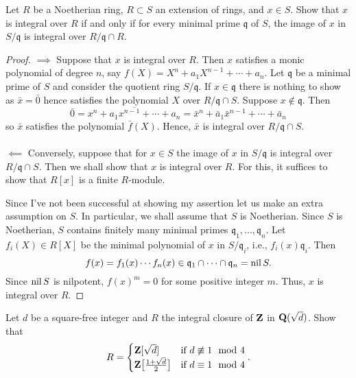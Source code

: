 \begin{problem}
Let $R$ be a Noetherian ring, $R\subset S$ an extension of rings,
and $x\in S$. Show that $x$ is integral over $R$ if and only if
for every minimal prime $\mathfrak{q}$ of $S$, the image of $x$
in $S/\mathfrak{q}$ is integral over $R/\mathfrak{q}\cap R$.
\end{problem}
\begin{proof}
$\implies$ Suppose that $x$ is integral over $R$. Then $x$ satisfies a
monic polynomial of degree $n$, say $f(X)=X^n+a_1X^{n-1}+\cdots+a_n$. Let
$\mathfrak{q}$ be a minimal prime of $S$ and consider the quotient ring
$S/\mathfrak{q}$. If $x\in\mathfrak{q}$ there is nothing to show as $\bar
x=\bar 0$ hence satisfies the polynomial $X$ over $R/\mathfrak{q}\cap
S$. Suppose $x\notin\mathfrak{q}$. Then
\[
\bar 0=\overline{x^n+a_1x^{n-1}+\cdots+a_n}
=\bar x^n+\bar a_1\bar x^{n-1}+\cdots+\bar a_n
\]
so $\bar x$ satisfies the polynomial $\bar f(X)$. Hence, $\bar x$ is
integral over $R/\mathfrak{q}\cap S$.
\\\\
$\impliedby$ Conversely, suppose that for $x\in S$ the image of $x$ in
$S/\mathfrak{q}$ is integral over $R/\mathfrak{q}\cap S$. Then we shall
show that $x$ is integral over $R$. For this, it suffices to show that
$R[x]$ is a finite $R$-module.

Since I've not been successful at showing my assertion let us make an extra
assumption on $S$. In particular, we shall assume that $S$ is
Noetherian. Since $S$ is Noetherian, $S$ contains finitely many minimal
primes $\mathfrak{q}_1,...,\mathfrak{q}_n$. Let $f_i(X)\in R[X]$ be the
minimal polynomial of $x$ in $S/\mathfrak{q}_i$, i.e.,
$f_i(x)\mathfrak{q}_i$. Then
\[
f(x)=f_1(x)\cdots f_n(x)\in\mathfrak{q}_1\cap\cdots\cap\mathfrak{q}_n=\operatorname{nil} S.
\]
Since $\operatorname{nil} S$ is nilpotent, $f(x)^m=0$ for some positive integer
$m$. Thus, $x$ is integral over $R$.
\end{proof}
\newpage
\begin{problem}
Let $d$ be a square-free integer and $R$ the integral closure of
$\mathbf{Z}$ in $\mathbf{Q}(\sqrt{d})$. Show that
\[
R=
\begin{cases}
\mathbf{Z}[\sqrt{d}]&\text{if $d\not\equiv 1\mod 4$}\\
\mathbf{Z}\bigl[\frac{1+\sqrt{d}}{2}\bigr]&\text{if $d\equiv 1\mod 4$}
\end{cases}.
\]
\end{problem}
